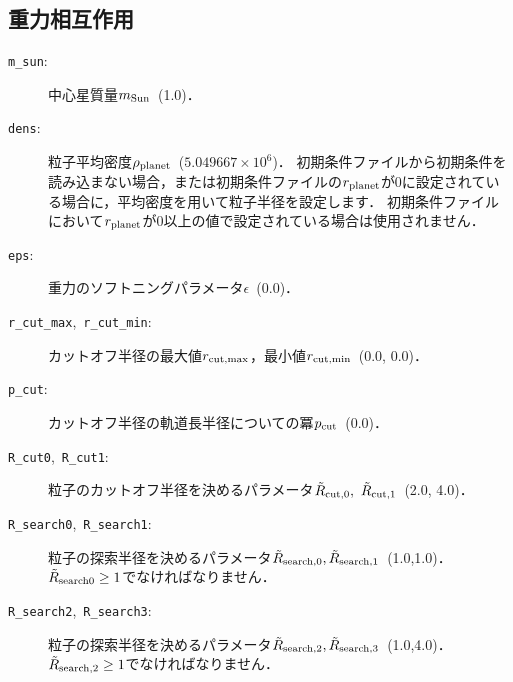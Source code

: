 \documentclass[12pt,a4paper,dvipdfmx]{jsarticle}
\begin{document}
\subsection{重力相互作用\label{paramg}}

\begin{description}
\item[\texttt{m\_sun}:]
中心星質量$m_{\rm Sun}$\ (1.0)．
\item[\texttt{dens}:]
粒子平均密度$\rho_{\rm planet}$\ ($5.049667\times 10^{6}$)．
初期条件ファイルから初期条件を読み込まない場合，または初期条件ファイルの$r_{\rm planet}$が0に設定されている場合に，平均密度を用いて粒子半径を設定します．
初期条件ファイルにおいて$r_{\rm planet}$が0以上の値で設定されている場合は使用されません．
\item[\texttt{eps}:]
重力のソフトニングパラメータ$\epsilon$\ ($0.0$)．
\item[\texttt{r\_cut\_max},\ \texttt{r\_cut\_min}:]
カットオフ半径の最大値$r_{\rm cut,max}$，最小値$r_{\rm cut,min}$\ (0.0, 0.0)．

\item[\texttt{p\_cut}:]
カットオフ半径の軌道長半径についての冪$p_{\rm cut}$\ (0.0)．

\item[\texttt{R\_cut0},\ \texttt{R\_cut1}:]
粒子のカットオフ半径を決めるパラメータ$\tilde{R}_{\rm cut,0},\ \tilde{R}_{\rm cut,1}$\ (2.0, 4.0)．

\item[\texttt{R\_search0},\ \texttt{R\_search1}:]
粒子の探索半径を決めるパラメータ$\tilde{R}_{\rm search,0},\tilde{R}_{\rm search,1}$\ (1.0,1.0)．
$\tilde{R}_{\rm search0}\geq 1$でなければなりません．

\item[\texttt{R\_search2},\ \texttt{R\_search3}:]
粒子の探索半径を決めるパラメータ$\tilde{R}_{\rm search,2},\tilde{R}_{\rm search,3}$\ (1.0,4.0)．
$\tilde{R}_{\rm search,2}\geq 1$でなければなりません．



\end{description}
\end{document}
